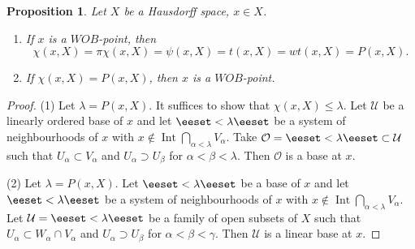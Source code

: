 \documentclass[preprint]{elsarticle}
\def\be{\beta}
\def\al{\alpha}
\def\ga{\gamma}
\def\la{\lambda}
\def\Int{\operatorname{Int}}
\def\set#1{\bbset#1\eeset}
\def\bbset#1:#2\eeset{\{#1\,:\,#2\}}
\def\cU{{\mathcal U}}
\def\cO{{\mathcal O}}
\newtheorem{proposition}{Proposition}[section]
\theoremstyle{definition}
\theoremstyle{remark}
\def\wob/{$WOB$}
\begin{document}
\begin{proposition}\label{p:1-1}
Let $X$ be a Hausdorff space, $x\in X$.
\begin{enumerate}
\item
If $x$ is a \wob/-point, then
\[
\chi(x,X)=\pi\chi(x,X)=\psi(x,X)=t(x,X)=wt(x,X)=P(x,X).
\]
\item
If $\chi(x,X)=P(x,X)$, then $x$ is a \wob/-point.
\end{enumerate}
\end{proposition}
\begin{proof}
(1) Let $\la=P(x,X)$. It suffices to show that $\chi(x,X)\leq \la$.
Let $\cU$ be a linearly ordered base of $x$ and let $\set{V_\al:\al<\la}$ be a system of neighbourhoods of $x$ with $x\notin \Int \bigcap_{\al<\la}V_\al$. Take $\cO=\set{U_\al:\al<\la}\subset \cU$ such that $U_\al\subset V_\al$ and $U_\al\supset U_\be$ for $\al<\be<\la$. Then $\cO$ is a base at $x$.

(2) Let $\la=P(x,X)$. Let $\set{W_\al:\al<\la}$ be a base of $x$ and let $\set{V_\al:\al<\la}$ be a system of neighbourhoods of $x$ with $x\notin \Int \bigcap_{\al<\la}V_\al$. 
Let $\cU=\set{U_\al:\al<\la}$ be a family of open subsets of $X$ such that $U_\al\subset W_\al\cap V_\al$ and $U_\al\supset U_\be$ for $\al<\be<\ga$. Then $\cU$ is a linear base at $x$.
\end{proof}
\end{document}
